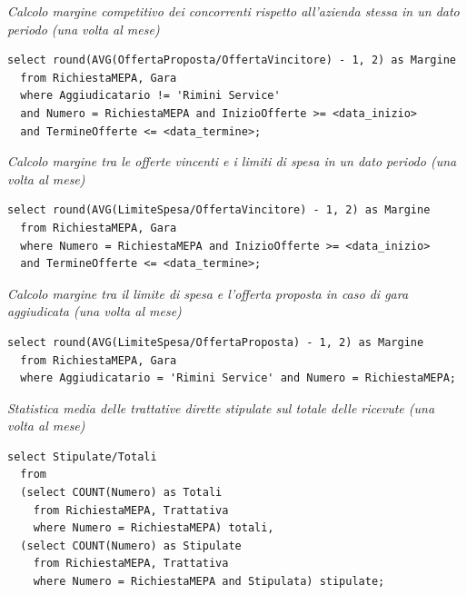 \noindent\textit{Calcolo margine competitivo dei concorrenti rispetto all’azienda stessa in un dato periodo (una volta al mese)}
\begin{verbatim}
select round(AVG(OffertaProposta/OffertaVincitore) - 1, 2) as Margine
  from RichiestaMEPA, Gara
  where Aggiudicatario != 'Rimini Service'
  and Numero = RichiestaMEPA and InizioOfferte >= <data_inizio>
  and TermineOfferte <= <data_termine>;
\end{verbatim}
\vspace{0.5cm}


\noindent\textit{Calcolo margine tra le offerte vincenti e i limiti di spesa in un dato periodo (una volta al mese)}
\begin{verbatim}
select round(AVG(LimiteSpesa/OffertaVincitore) - 1, 2) as Margine
  from RichiestaMEPA, Gara
  where Numero = RichiestaMEPA and InizioOfferte >= <data_inizio>
  and TermineOfferte <= <data_termine>;
\end{verbatim}
\vspace{0.5cm}


\noindent\textit{Calcolo margine tra il limite di spesa e l'offerta proposta in caso di gara aggiudicata (una volta al mese)}
\begin{verbatim}
select round(AVG(LimiteSpesa/OffertaProposta) - 1, 2) as Margine
  from RichiestaMEPA, Gara
  where Aggiudicatario = 'Rimini Service' and Numero = RichiestaMEPA;
\end{verbatim}
\vspace{0.5cm}

\noindent{}
\newline\newline

\noindent\textit{Statistica media delle trattative dirette stipulate sul totale delle ricevute (una volta al mese)}
\begin{verbatim}
select Stipulate/Totali
  from
  (select COUNT(Numero) as Totali
    from RichiestaMEPA, Trattativa
    where Numero = RichiestaMEPA) totali,
  (select COUNT(Numero) as Stipulate
    from RichiestaMEPA, Trattativa
    where Numero = RichiestaMEPA and Stipulata) stipulate;
\end{verbatim}
\vspace{0.5cm}

